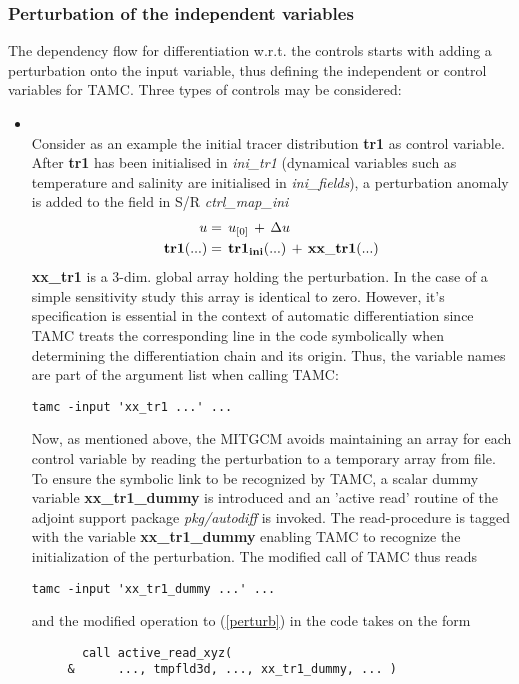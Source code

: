 \subsubsection{Perturbation of the independent variables}
%
The dependency flow for differentiation w.r.t. the controls 
starts with adding a perturbation onto the input variable,
thus defining the independent or control variables for TAMC.
Three types of controls may be considered:
%
\begin{itemize}
%
\item 
{}
\\
%
Consider as an example the initial tracer distribution
{\bf tr1} as control variable.
After {\bf tr1} has been initialised in
{\it ini\_tr1} (dynamical variables such as
temperature and salinity are initialised in {\it ini\_fields}),
a perturbation anomaly is added to the field in S/R
{\it ctrl\_map\_ini}
%
\begin{equation}
\begin{split}
u         & = \, u_{[0]} \, + \, \Delta u \\
{\bf tr1}(...) & = \, {\bf tr1_{ini}}(...) \, + \, {\bf xx\_tr1}(...)
\label{perturb}
\end{split}
\end{equation}
%
{\bf xx\_tr1} is a 3-dim. global array 
holding the perturbation. In the case of a simple
sensitivity study this array is identical to zero.
However, it's specification is essential in the context
of automatic differentiation since TAMC
treats the corresponding line in the code symbolically
when determining the differentiation chain and its origin.
Thus, the variable names are part of the argument list
when calling TAMC: 
%
\begin{verbatim}
tamc -input 'xx_tr1 ...' ...
\end{verbatim}
%
Now, as mentioned above, the MITGCM avoids maintaining
an array for each control variable by reading the
perturbation to a temporary array from file.
To ensure the symbolic link to be recognized by TAMC, a scalar
dummy variable {\bf xx\_tr1\_dummy} is introduced
and an 'active read' routine of the adjoint support
package {\it pkg/autodiff} is invoked.
The read-procedure is tagged with the variable
{\bf xx\_tr1\_dummy} enabling TAMC to recognize the
initialization of the perturbation.
The modified call of TAMC thus reads
%
\begin{verbatim}
tamc -input 'xx_tr1_dummy ...' ...
\end{verbatim}
%
and the modified operation to (\ref{perturb})
in the code takes on the form
%
\begin{verbatim}
       call active_read_xyz( 
     &      ..., tmpfld3d, ..., xx_tr1_dummy, ... )


\end{verbatim}
\end{itemize}
